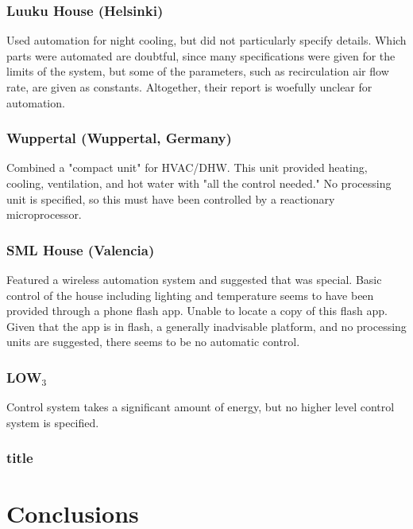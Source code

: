 		\subsubsection{Luuku House (Helsinki)}
			
			Used automation for night cooling, but did not particularly specify details.
			Which parts were automated are doubtful, since many specifications were given for the limits of the system, but some of the parameters, such as recirculation air flow rate, are given as constants.
			Altogether, their report is woefully unclear for automation.
			
		\subsubsection{Wuppertal (Wuppertal, Germany)}
		
			Combined a "compact unit" for HVAC/DHW.
			This unit provided heating, cooling, ventilation, and hot water with "all the control needed."
			No processing unit is specified, so this must have been controlled by a reactionary microprocessor.
			
			
		\subsubsection{SML House (Valencia)}
		
			Featured a wireless automation system and suggested that was special.
			Basic control of the house including lighting and temperature seems to have been provided through a phone flash app.
			Unable to locate a copy of this flash app.
			Given that the app is in flash, a generally inadvisable platform, and no processing units are suggested, there seems to be no automatic control.
			
		\subsubsection{LOW$_3$}
		
			Control system takes a significant amount of energy, but no higher level control system is specified.
			
		\subsubsection{title}

\section{Conclusions}

